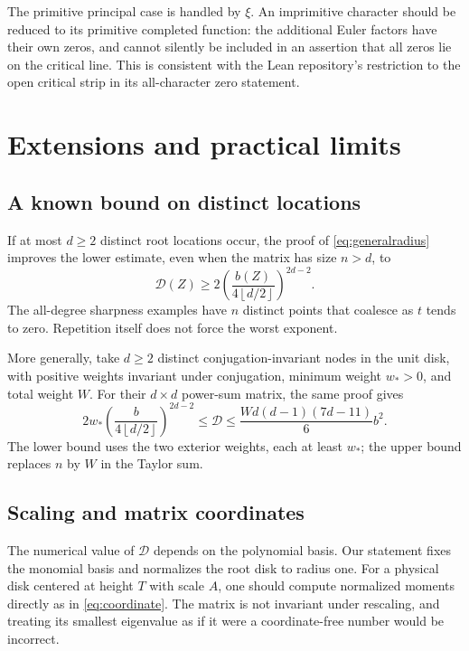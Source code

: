 \documentclass[11pt]{article}
\theoremstyle{definition}
\newcommand{\defect}{\mathcal D}
\newcommand{\floor}[1]{\left\lfloor#1\right\rfloor}
\begin{document}
The primitive principal case is handled by $\xi$. An imprimitive character
should be reduced to its primitive completed function: the additional Euler
factors have their own zeros, and cannot silently be included in an assertion
that all zeros lie on the critical line. This is consistent with the Lean
repository's restriction to the open critical strip in its all-character
zero statement.

\section{Extensions and practical limits}

\subsection{A known bound on distinct locations}

If at most $d\geq2$ distinct root locations occur, the proof of
\eqref{eq:generalradius} improves the lower estimate, even when the matrix
has size $n>d$, to
\begin{equation}
 \defect(Z)\geq
 2\left(\frac{b(Z)}{4\floor{d/2}}\right)^{2d-2}.
 \label{eq:distinct}
\end{equation}
The all-degree sharpness examples have $n$ distinct points that coalesce as
$t$ tends to zero. Repetition itself does not force the worst exponent.

More generally, take $d\geq2$ distinct conjugation-invariant nodes in the unit
disk, with positive
weights invariant under conjugation, minimum weight $w_*>0$, and total
weight $W$. For their $d\times d$ power-sum matrix, the same proof gives
\[
 2w_*\left(\frac b{4\floor{d/2}}\right)^{2d-2}
 \leq\defect
 \leq\frac{W d(d-1)(7d-11)}6 b^2.
\]
The lower bound uses the two exterior weights, each at least $w_*$;
the upper bound replaces $n$ by $W$ in the Taylor sum.

\subsection{Scaling and matrix coordinates}

The numerical value of $\defect$ depends on the polynomial basis. Our
statement fixes the monomial basis and normalizes the root disk to radius
one. For a physical disk centered at height $T$ with scale $A$, one should
compute normalized moments directly as in \eqref{eq:coordinate}.
The matrix is not invariant under rescaling, and treating its smallest
eigenvalue as if it were a coordinate-free number would be incorrect.
\end{document}
